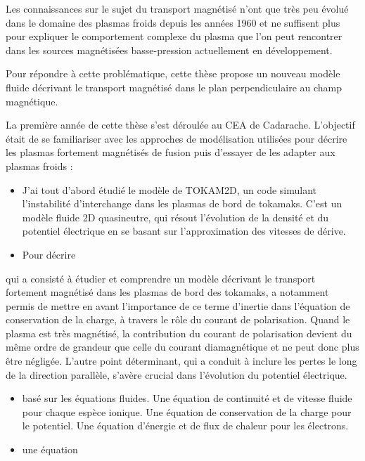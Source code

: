 Les connaissances sur le sujet du transport magnétisé n'ont que très peu évolué
dans le domaine des plasmas froids depuis les années 1960 et ne suffisent plus
pour expliquer le comportement complexe du plasma que l'on peut
rencontrer dans les sources magnétisées basse-pression actuellement en développement.

Pour répondre à cette problématique, cette thèse propose un nouveau
modèle fluide décrivant le transport magnétisé dans le plan perpendiculaire au
champ magnétique.

La première année de cette thèse s'est déroulée au CEA de Cadarache.
L'objectif était de se familiariser avec les approches de modélisation
utilisées pour décrire les plasmas fortement magnétisés de fusion puis d'essayer
de les adapter aux plasmas froids :

\begin{itemize}
  \item J'ai tout d'abord étudié le modèle de TOKAM2D, un code simulant
  l'instabilité d'interchange dans les plasmas de bord de tokamaks. C'est un
  modèle fluide 2D quasineutre, qui résout l'évolution de la densité et du
  potentiel électrique en se basant sur l'approximation des vitesses de dérive.
  \item Pour décrire 
\end{itemize} 
  qui a consisté à étudier et comprendre un
modèle décrivant le transport fortement magnétisé dans les plasmas de bord des tokamaks, a notamment permis de mettre en avant l'importance de ce terme d'inertie dans l'équation de conservation de la charge, à travers le rôle
du courant de polarisation.
Quand le plasma est très magnétisé, la contribution du courant de polarisation
devient du même ordre de grandeur que celle du courant diamagnétique et ne
peut donc plus être négligée. L'autre point déterminant, qui a conduit à
inclure les pertes le long de la direction parallèle, s'avère crucial dans
l'évolution du potentiel électrique.

\begin{itemize}
  \item basé sur les équations fluides. Une équation de continuité et de vitesse
  fluide pour chaque espèce ionique. Une équation de conservation de la charge
  pour le potentiel. Une équation d'énergie et de flux de chaleur pour les
  électrons.
  \item une équation 
\end{itemize} 


